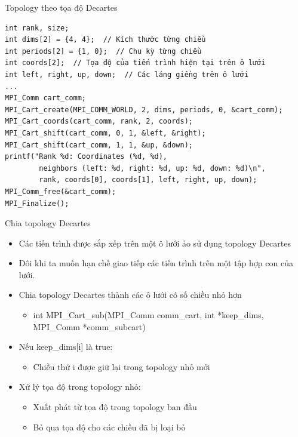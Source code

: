 \documentclass[10pt]{beamer}
\theoremstyle{remark}
\numberwithin{algocf}{section}
\numberwithin{equation}{section}
\numberwithin{dl}{section}
\numberwithin{figure}{section}
\begin{document}
\begin{frame}{Topology theo tọa độ Decartes}
    \begin{verbatim}
int rank, size;
int dims[2] = {4, 4};  // Kích thước từng chiều
int periods[2] = {1, 0};  // Chu kỳ từng chiều
int coords[2];  // Tọa độ của tiến trình hiện tại trên ô lưới
int left, right, up, down;  // Các láng giềng trên ô lưới
...
MPI_Comm cart_comm;
MPI_Cart_create(MPI_COMM_WORLD, 2, dims, periods, 0, &cart_comm);
MPI_Cart_coords(cart_comm, rank, 2, coords);
MPI_Cart_shift(cart_comm, 0, 1, &left, &right);
MPI_Cart_shift(cart_comm, 1, 1, &up, &down); 
printf("Rank %d: Coordinates (%d, %d), 
        neighbors (left: %d, right: %d, up: %d, down: %d)\n",
        rank, coords[0], coords[1], left, right, up, down); 
MPI_Comm_free(&cart_comm);
MPI_Finalize();
    \end{verbatim}
\end{frame}

\begin{frame}{Chia topology Decartes}
    \begin{itemize}
        \item Các tiến trình được sắp xếp trên một ô lưới ảo sử dụng topology Decartes
        \item Đôi khi ta muốn hạn chế giao tiếp các tiến trình trên một tập hợp con của lưới.
        \item Chia topology Decartes thành các ô lưới có số chiều nhỏ hơn
        \begin{itemize}
            \item int MPI\_Cart\_sub(MPI\_Comm comm\_cart, int *keep\_dims,
                                     MPI\_Comm *comm\_subcart) 
        \end{itemize}
        \item Nếu keep\_dims[i] là true:
        \begin{itemize}
            \item Chiều thứ i được giữ lại trong topology nhỏ mới
        \end{itemize}
        \item Xử lý tọa độ trong topology nhỏ:
        \begin{itemize}
            \item Xuất phát từ tọa độ trong topology ban đầu
            \item Bỏ qua tọa độ cho các chiều đã bị loại bỏ
        \end{itemize}
    \end{itemize}
\end{frame}
\end{document}
